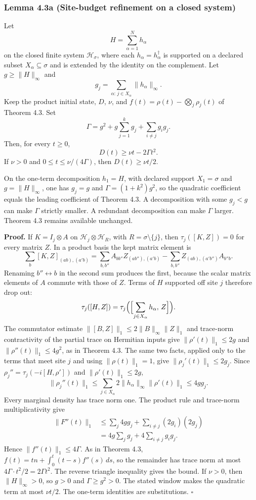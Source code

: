 \documentclass[
  11pt,
]{article}
\begin{document}
\subsubsection{Lemma 4.3a (Site-budget refinement on a closed system)}\label{lemma-4.3a-site-budget-refinement-on-a-closed-system}

Let
\[
H=\sum_{\alpha=1}^{N}h_\alpha
\]
on the closed finite system \(\mathcal H_\sigma\), where each
\(h_\alpha=h_\alpha^\dagger\) is supported on a declared subset
\(X_\alpha\subseteq\sigma\) and is extended by the identity on the
complement. Let \(g\ge\|H\|_\infty\) and
\[
g_j=\sum_{\alpha:\,j\in X_\alpha}\|h_\alpha\|_\infty.
\]
Keep the product initial state, \(D\), \(\nu\), and
\(f(t)=\rho(t)-\bigotimes_j\rho_j(t)\) of Theorem 4.3. Set
\[
\Gamma
=g^2+g\sum_{j=1}^k g_j+\sum_{i\ne j}g_ig_j.
\]
Then, for every \(t\ge0\),
\[
D(t)\ge\nu t-2\Gamma t^2.
\]
If \(\nu>0\) and \(0\le t\le\nu/(4\Gamma)\), then \(D(t)\ge\nu t/2\).

On the one-term decomposition \(h_1=H\), with declared support \(X_1=\sigma\) and \(g=\|H\|_\infty\), one has
\(g_j=g\) and \(\Gamma=(1+k^2)g^2\), so the quadratic coefficient equals
the leading coefficient of Theorem 4.3. A decomposition with some
\(g_j<g\) can make \(\Gamma\) strictly smaller. A redundant decomposition
can make \(\Gamma\) larger. Theorem 4.3 remains available unchanged.

\textbf{Proof.} If \(K=I_j\otimes A\) on \(\mathcal H_j\otimes\mathcal H_R\),
with \(R=\sigma\setminus\{j\}\), then \(\tau_j([K,Z])=0\) for every
matrix \(Z\). In a product basis the kept matrix element is
\[
\sum_b[K,Z]_{(ab),(a'b)}
=\sum_{b,b''}A_{bb''}Z_{(ab''),(a'b)}
-\sum_{b,b''}Z_{(ab),(a'b'')}A_{b''b}.
\]
Renaming \(b''\leftrightarrow b\) in the second sum produces the first,
because the scalar matrix elements of \(A\) commute with those of \(Z\).
Terms of \(H\) supported off site \(j\) therefore drop out:
\[
\tau_j([H,Z])
=\tau_j\Bigl(\Bigl[\sum_{j\in X_\alpha}h_\alpha,\,Z\Bigr]\Bigr).
\]
The commutator estimate
\(\|[B,Z]\|_1\le2\|B\|_\infty\|Z\|_1\) and trace-norm contractivity of
the partial trace on Hermitian inputs give
\(\|\rho'(t)\|_1\le2g\) and \(\|\rho''(t)\|_1\le4g^2\), as in Theorem 4.3.
The same two facts, applied only to the terms that meet site \(j\) and
using \(\|\rho(t)\|_1=1\), give \(\|\rho_j'(t)\|_1\le2g_j\). Since
\(\rho_j''=\tau_j(-i[H,\rho'])\) and \(\|\rho'(t)\|_1\le2g\),
\[
\|\rho_j''(t)\|_1
\le\sum_{j\in X_\alpha}2\|h_\alpha\|_\infty\|\rho'(t)\|_1
\le4gg_j.
\]
Every marginal density has trace norm one.
The product rule and trace-norm multiplicativity give
\[
\begin{aligned}
\|F''(t)\|_1
&\le\sum_j4gg_j+\sum_{i\ne j}(2g_i)(2g_j)\\
&=4g\sum_jg_j+4\sum_{i\ne j}g_ig_j.
\end{aligned}
\]
Hence \(\|f''(t)\|_1\le4\Gamma\). As in Theorem 4.3,
\(f(t)=tn+\int_0^t(t-s)f''(s)\,ds\), so the remainder has trace norm at
most \(4\Gamma\cdot t^2/2=2\Gamma t^2\). The reverse triangle inequality
gives the bound.
If \(\nu>0\), then \(\|H\|_\infty>0\), so \(g>0\) and \(\Gamma\ge g^2>0\).
The stated window makes the quadratic term at most \(\nu t/2\).
The one-term identities are substitutions. \(\square\)
\end{document}
